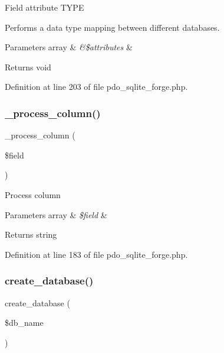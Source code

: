 Field attribute T\+Y\+PE

Performs a data type mapping between different databases.


\begin{DoxyParams}[1]{Parameters}
array & {\em \&\$attributes} & \\
\hline
\end{DoxyParams}
\begin{DoxyReturn}{Returns}
void 
\end{DoxyReturn}


Definition at line 203 of file pdo\+\_\+sqlite\+\_\+forge.\+php.

\mbox{\label{class_c_i___d_b__pdo__sqlite__forge_a8f38f1c5b5dddecca4befbe393f3f299}} 
\subsubsection{\texorpdfstring{\_process\_column()}{\_process\_column()}}
{\footnotesize\ttfamily \+\_\+process\+\_\+column (\begin{DoxyParamCaption}\item[{}]{\$field }\end{DoxyParamCaption})\hspace{0.3cm}{\ttfamily [protected]}}

Process column


\begin{DoxyParams}[1]{Parameters}
array & {\em \$field} & \\
\hline
\end{DoxyParams}
\begin{DoxyReturn}{Returns}
string 
\end{DoxyReturn}


Definition at line 183 of file pdo\+\_\+sqlite\+\_\+forge.\+php.

\mbox{\label{class_c_i___d_b__pdo__sqlite__forge_a902a7267babceb2ce595706f217e00ad}} 
\subsubsection{\texorpdfstring{create\_database()}{create\_database()}}
{\footnotesize\ttfamily create\+\_\+database (\begin{DoxyParamCaption}\item[{}]{\$db\+\_\+name }\end{DoxyParamCaption})}

